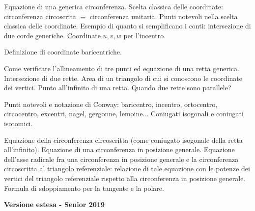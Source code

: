 Equazione di una generica circonferenza. Scelta classica delle coordinate: circonferenza circoscrita $\equiv$ circonferenza unitaria. Punti notevoli nella scelta classica delle coordinate. Esempio di quanto si semplificano i conti: intersezione di due corde generiche. Coordinate $u,v,w$ per l'incentro. 

\vspace{0.5cm}
Definizione di coordinate baricentriche. 

Come verificare l'allineamento di tre punti ed equazione di una retta generica. Intersezione di due rette. Area di un triangolo di cui si conoscono le coordinate dei vertici. Punto all'infinito di una retta. Quando due rette sono parallele?

Punti notevoli e notazione di Conway: baricentro, incentro, ortocentro, circocentro, excentri, nagel, gergonne, lemoine... Coniugati isogonali e coniugati isotomici.

Equazione della circonferenza circoscritta (come coniugato isogonale della retta all'infinito).
Equazione di una circonferenza in posizione generale. Equazione dell'asse radicale fra una circonferenza in posizione generale e la circonferenza circoscritta al triangolo referenziale: relazione di tale equazione con le potenze dei vertici del triangolo referenziale rispetto alla circonferenza in posizione generale. Formula di sdoppiamento per la tangente e la polare.

\vspace{0.3cm}
\large{\textbf{Versione estesa - Senior 2019}}\normalsize

